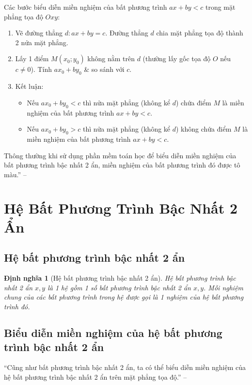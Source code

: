 \documentclass[oneside]{book}
\numberwithin{equation}{section}
\newtheorem{dinhnghia}{Định nghĩa}[section]
\begin{document}
\begin{tcolorbox}
	Các bước biểu diễn miền nghiệm của bất phương trình $ax + by < c$ trong mặt phẳng tọa độ $Oxy$:
	\begin{enumerate}
		\item Vẽ đường thẳng $d:ax + by = c$. Đường thẳng $d$ chia mặt phẳng tọa độ thành 2 nửa mặt phẳng.
		\item Lấy 1 điểm $M(x_0;y_0)$ không nằm trên $d$ (thường lấy gốc tọa độ $O$ nếu $c\ne 0$). Tính $ax_0 + by_0$ \& so sánh với $c$.
		\item Kết luận:
		\begin{itemize}
			\item Nếu $ax_0 + by_0 < c$ thì nửa mặt phẳng (không kể $d$) chứa điểm $M$ là miền nghiệm của bất phương trình $ax + by < c$.
			\item Nếu $ax_0 + by_0 > c$ thì nửa mặt phẳng (không kể $d$) không chứa điểm $M$ là miền nghiệm của bất phương trình $ax + by < c$.
		\end{itemize}
	\end{enumerate}
\end{tcolorbox}
Thông thường khi sử dụng phần mềm toán học để biểu diễn miền nghiệm của bất phương trình bậc nhất 2 ẩn, miền nghiệm của bất phương trình đó được tô màu.'' --\cite[pp. 23--24]{SGK_Toan_10_Canh_Dieu_tap_1}

\section{Hệ Bất Phương Trình Bậc Nhất 2 Ẩn}

\subsection{Hệ bất phương trình bậc nhất 2 ẩn}

\begin{dinhnghia}[Hệ bất phương trình bậc nhất 2 ẩn]
	\emph{Hệ bất phương trình bậc nhất 2 ẩn $x,y$} là 1 hệ gồm 1 số bất phương trình bậc nhất 2 ẩn $x,y$. Mỗi nghiệm chung của các bất phương trình trong hệ được gọi là 1 \emph{nghiệm} của hệ bất phương trình đó.
\end{dinhnghia}

\subsection{Biểu diễn miền nghiệm của hệ bất phương trình bậc nhất 2 ẩn}
``Cũng như bất phương trình bậc nhất 2 ẩn, ta có thể biểu diễn miền nghiệm của hệ bất phương trình bậc nhất 2 ẩn trên mặt phẳng tọa độ.'' --\cite[p. 26]{SGK_Toan_10_Canh_Dieu_tap_1}
\end{document}
